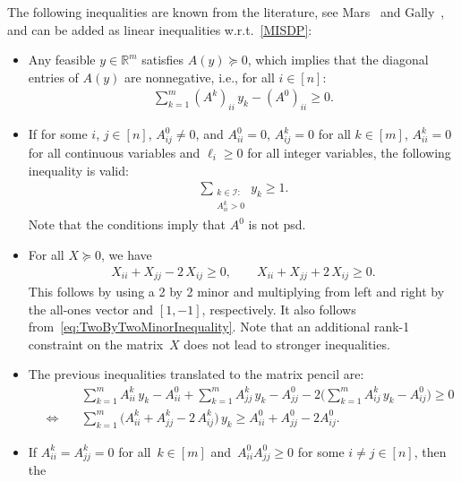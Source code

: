 \documentclass[10pt, a4paper]{article}
\newcommand{\R}{\mathds{R}}
\begin{document}
The following inequalities are known from the literature, see
Mars~\cite{Mar13} and  Gally~\cite{Gal19}, and can be added as linear inequalities w.r.t.\
\eqref{MISDP}:
\begin{itemize}
\item Any feasible $y \in \R^m$ satisfies $A(y) \succeq 0$, which implies
  that the diagonal entries of $A(y)$ are nonnegative, i.e., for all
  $i \in [n]$:
  \begin{align}\label{eq:diaggezero}
    \sum_{k = 1}^m (A^k)_{ii}\, y_k - (A^0)_{ii} \geq 0.
  \end{align}
\item If for some $i$, $j \in [n]$, $A^0_{ij} \neq 0$, and $A^0_{ii} = 0$,
  $A^k_{ij} = 0$ for all $k \in [m]$, $A^k_{ii} = 0$ for all continuous
  variables and $\ell_i \geq 0$ for all integer variables,
  the following inequality is valid:
  \begin{align}\label{eq:diagzeroimpl}
    \sum_{\substack{k \in \mathcal{I}:\\ A^k_{ii} > 0}} y_k \geq1.
  \end{align}
  Note that the conditions imply that $A^0$ is not psd.
\item For all $X \succeq 0$, we have
  \begin{align}\label{eq:2minorlinP}
    X_{ii} + X_{jj} - 2\, X_{ij} \geq 0,\qquad
    X_{ii} + X_{jj} + 2\, X_{ij} \geq 0.
  \end{align}
  This follows by using a 2 by 2 minor and multiplying from left
  and right by the all-ones vector and $[1,-1]$, respectively. It also
  follows from~\eqref{eq:TwoByTwoMinorInequality}.
  Note that an additional rank-1 constraint on the matrix~$X$ does not lead
  to stronger inequalities.
\item The previous inequalities translated to the matrix pencil are:
  \begin{equation}\label{eq:2minorlinD}
    \begin{aligned}
      & \sum_{k=1}^m A^k_{ii}\, y_k - A^0_{ii} + \sum_{k=1}^m A^k_{jj}\, y_k - A^0_{jj} - 2 \Big(\sum_{k=1}^m A^k_{ij}\, y_k - A^0_{ij}\Big) \geq 0\\
      \quad\Leftrightarrow\quad& \sum_{k=1}^m \Big(A ^k_{ii} + A^k_{jj} -
      2\, A^k_{ij}\Big)\, y_k \geq A^0_{ii} + A^0_{jj} - 2 A^0_{ij}.
    \end{aligned}
  \end{equation}
\item If $A^k_{ii} = A^k_{jj} = 0$ for all~$k \in [m]$
  and~$A^0_{ii}A^0_{jj} \geq 0$ for some $i \neq j \in [n]$, then the

\end{itemize}
\end{document}
